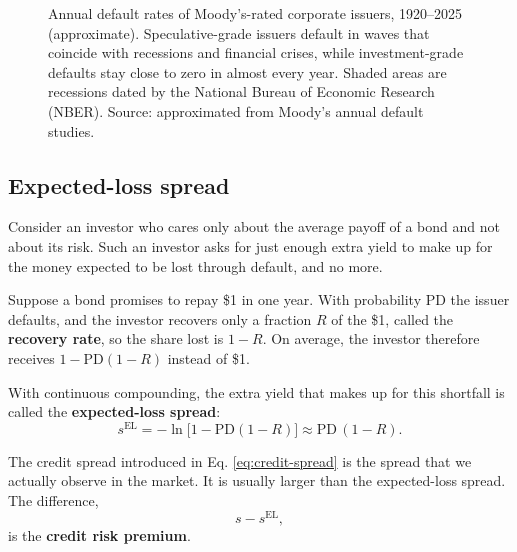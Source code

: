 \begin{figure}[htbp]
\caption{Annual default rates of Moody's-rated corporate issuers, 1920--2025 (approximate). Speculative-grade issuers default in waves that coincide with recessions and financial crises, while investment-grade defaults stay close to zero in almost every year. Shaded areas are recessions dated by the National Bureau of Economic Research (NBER). Source: approximated from Moody's annual default studies.}
\label{fig:default-rates-time}
\end{figure}


\subsection{Expected-loss spread}

Consider an investor who cares only about the average payoff of a bond and not about its risk. Such an investor asks for just enough extra yield to make up for the money expected to be lost through default, and no more. 

Suppose a bond promises to repay \$1 in one year. With probability PD the issuer defaults, and the investor recovers only a fraction $R$ of the \$1, called the \textbf{recovery rate}, so the share lost is $1-R$. On average, the investor therefore receives $1 - \text{PD}(1-R)$ instead of \$1. 



With continuous compounding, the extra yield that makes up for this shortfall is called the \textbf{expected-loss spread}:
\begin{equation}
  s^{\text{EL}} = -\ln\bigl[1 - \text{PD}(1-R)\bigr] \approx \text{PD}\,(1-R).
  \label{eq:expected-loss-spread}
\end{equation}

The credit spread introduced in Eq. \ref{eq:credit-spread} is the spread that we actually observe in the market. It is usually larger than the expected-loss spread. The difference,
\begin{equation}
  s - s^{\text{EL}},
  \label{eq:credit-risk-premium}
\end{equation}
is the \textbf{credit risk premium}. 

